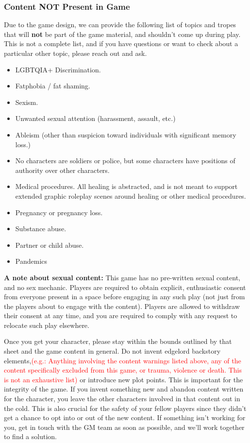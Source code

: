 \documentclass[sheet]{GL2020}
\begin{document}
\subsubsection{Content NOT Present in Game}
Due to the game design, we can provide the following list of topics and tropes that will \textbf{not} be part of the game material, and shouldn't come up during play. This is not a complete list, and if you have questions or want to check about a particular other topic, please reach out and ask.

\begin{multicols}{2}
\begin{itemize}
  	\item LGBTQIA+ Discrimination.
	\item Fatphobia / fat shaming.
	\item Sexism.
	\item Unwanted sexual attention (harassment, assault, etc.)
	\item Ableism (other than suspicion toward individuals with significant memory loss.)
	\item No characters are soldiers or police, but some characters have positions of authority over other characters.
	\item Medical procedures. All healing is abstracted, and is not meant to support extended graphic roleplay scenes around healing or other medical procedures.
	\item Pregnancy or pregnancy loss.
	\item Substance abuse.
	\item Partner or child abuse.
	\item Pandemics
\end{itemize}
\end{multicols}

\textbf{A note about sexual content:} This game has no pre-written sexual content, and no sex mechanic. Players are required to obtain explicit, enthusiastic consent from everyone present in a space before engaging in any such play (not just from the players about to engage with the content). Players are allowed to withdraw their consent at any time, and you are required to comply with any request to relocate such play elsewhere.

Once you get your character, please stay within the bounds outlined by that sheet and the game content in general. Do not invent edgelord backstory elements,\textcolor{red}{(e.g.: Anything involving the content warnings listed above, any of the content specifically excluded from this game, or trauma, violence or death. This is not an exhaustive list)} or introduce new plot points. This is important for the integrity of the game. If you invent something new and abandon content written for the character, you leave the other characters involved in that content out in the cold. This is also crucial for the safety of your fellow players since they didn't get a chance to opt into or out of the new content. If something isn't working for you, get in touch with the GM team as soon as possible, and we'll work together to find a solution.
\end{document}
